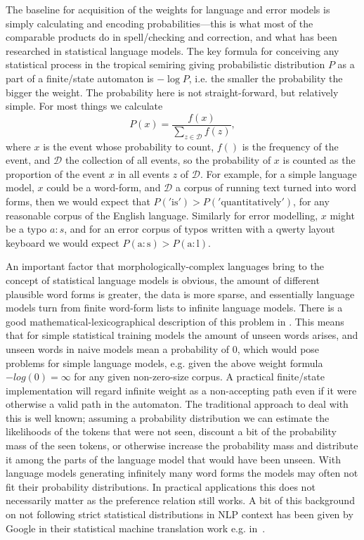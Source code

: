 \documentclass[officiallayout]{unihelcompling}
\begin{document}
The baseline for acquisition of the weights for language and error models is
simply calculating and encoding probabilities---this is what most of the
comparable products do in spell\-/checking and correction, and what has been
researched in statistical language models. The key formula for conceiving any
statistical process in the tropical semiring giving probabilistic distribution
$P$ as a part of a finite\-/state automaton is $-\log P$, i.e. the smaller the
probability the bigger the weight. The probability here is not
straight-forward, but relatively simple. For most things we calculate 
\begin{equation}
    P(x) = \frac{f(x)}{\sum_{z \in \mathcal{D}} f(z)},
\end{equation}
where $x$ is the event whose probability to count, $f()$ is the frequency of
the event, and $\mathcal{D}$ the collection of all events, so the probability
of $x$ is counted as the proportion of the event $x$ in all events $z$ of
$\mathcal{D}$. For example, for a simple language model, $x$ could be a
word-form, and $\mathcal{D}$ a corpus of running text turned into word forms,
then we would expect that $P('\mathrm{is}') > P('\mathrm{quantitatively}')$,
for any reasonable corpus of the English language. Similarly for error
modelling, $x$ might be a typo $a:s$, and for an error corpus of typos written
with a qwerty layout keyboard we would expect $P(\mathrm{a}:\mathrm{s}) >
P(\mathrm{a}:\mathrm{l})$.

An important factor that morphologically-complex languages bring to the concept
of statistical language models is obvious, the amount of different plausible
word forms is greater, the data is more sparse, and essentially language models
turn from finite word-form lists to infinite language models.  There is a good
mathematical-lexicographical description of this problem in
\citet{kornai2002many}. This means that for simple statistical training models
the amount of unseen words arises, and unseen words in naive models mean a
probability of $0$, which would pose problems for simple language models, e.g.
given the above weight formula $-log(0) = \infty$ for any given non-zero-size
corpus. A practical finite\-/state implementation will regard infinite weight as
a non-accepting path even if it were otherwise a valid path in the automaton.
The traditional approach to deal with this is well known; assuming a
probability distribution we can estimate the likelihoods of the tokens that
were not seen, discount a bit of the probability mass of the seen tokens, or
otherwise increase the probability mass and distribute it among the parts of
the language model that would have been unseen. With language models generating
infinitely many word forms the models may often not fit their probability
distributions. In practical applications this does not necessarily matter as
the preference relation still works. A bit of this background on not following
strict statistical distributions in NLP context has been given by Google in
their statistical machine translation work e.g.  in~\citet{brants2007large}.
\end{document}
